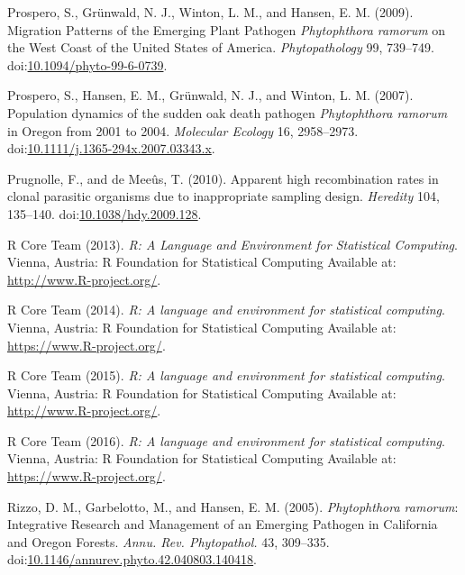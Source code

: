 \documentclass[double,12pt]{beavtex}
\begin{document}
  \hypertarget{ref-prospero2009migration}{}
  Prospero, S., Grünwald, N. J., Winton, L. M., and Hansen, E. M. (2009).
  Migration Patterns of the Emerging Plant Pathogen \emph{Phytophthora
  ramorum} on the West Coast of the United States of America.
  \emph{Phytopathology} 99, 739--749.
  doi:\href{https://doi.org/10.1094/phyto-99-6-0739}{10.1094/phyto-99-6-0739}.
  
  \hypertarget{ref-prospero2007population}{}
  Prospero, S., Hansen, E. M., Grünwald, N. J., and Winton, L. M. (2007).
  Population dynamics of the sudden oak death pathogen \emph{Phytophthora
  ramorum} in Oregon from 2001 to 2004. \emph{Molecular Ecology} 16,
  2958--2973.
  doi:\href{https://doi.org/10.1111/j.1365-294x.2007.03343.x}{10.1111/j.1365-294x.2007.03343.x}.
  
  \hypertarget{ref-prugnolle2010apparent}{}
  Prugnolle, F., and de Meeûs, T. (2010). Apparent high recombination
  rates in clonal parasitic organisms due to inappropriate sampling
  design. \emph{Heredity} 104, 135--140.
  doi:\href{https://doi.org/10.1038/hdy.2009.128}{10.1038/hdy.2009.128}.
  
  \hypertarget{ref-R2013}{}
  R Core Team (2013). \emph{R: A Language and Environment for Statistical
  Computing}. Vienna, Austria: R Foundation for Statistical Computing
  Available at: \url{http://www.R-project.org/}.
  
  \hypertarget{ref-R2014}{}
  R Core Team (2014). \emph{R: A language and environment for statistical
  computing}. Vienna, Austria: R Foundation for Statistical Computing
  Available at: \url{https://www.R-project.org/}.
  
  \hypertarget{ref-R}{}
  R Core Team (2015). \emph{R: A language and environment for statistical
  computing}. Vienna, Austria: R Foundation for Statistical Computing
  Available at: \url{http://www.R-project.org/}.
  
  \hypertarget{ref-R2016}{}
  R Core Team (2016). \emph{R: A language and environment for statistical
  computing}. Vienna, Austria: R Foundation for Statistical Computing
  Available at: \url{https://www.R-project.org/}.
  
  \hypertarget{ref-rizzo2005phytophthora}{}
  Rizzo, D. M., Garbelotto, M., and Hansen, E. M. (2005).
  \emph{Phytophthora ramorum}: Integrative Research and Management of an
  Emerging Pathogen in California and Oregon Forests. \emph{Annu. Rev.
  Phytopathol.} 43, 309--335.
  doi:\href{https://doi.org/10.1146/annurev.phyto.42.040803.140418}{10.1146/annurev.phyto.42.040803.140418}.
  
\end{document}
